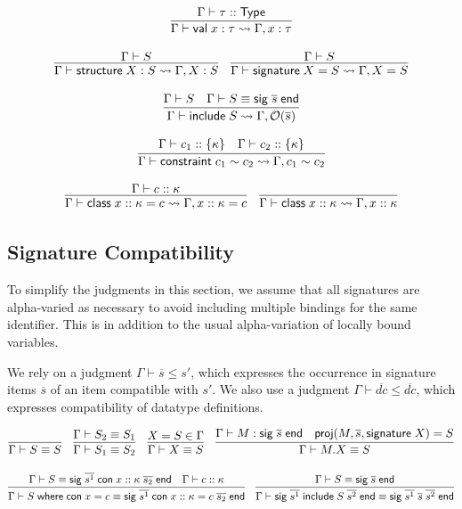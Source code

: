 \documentclass{article}
\newcommand{\mt}[1]{\mathsf{#1}}
\begin{document}
$$\infer{\Gamma \vdash \mt{val} \; x : \tau \leadsto \Gamma, x : \tau}{
  \Gamma \vdash \tau :: \mt{Type}
}$$

$$\infer{\Gamma \vdash \mt{structure} \; X : S \leadsto \Gamma, X : S}{
  \Gamma \vdash S
}
\quad \infer{\Gamma \vdash \mt{signature} \; X = S \leadsto \Gamma, X = S}{
  \Gamma \vdash S
}$$

$$\infer{\Gamma \vdash \mt{include} \; S \leadsto \Gamma, \mathcal O(\overline{s})}{
  \Gamma \vdash S
  & \Gamma \vdash S \equiv \mt{sig} \; \overline{s} \; \mt{end}
}$$

$$\infer{\Gamma \vdash \mt{constraint} \; c_1 \sim c_2 \leadsto \Gamma, c_1 \sim c_2}{
  \Gamma \vdash c_1 :: \{\kappa\}
  & \Gamma \vdash c_2 :: \{\kappa\}
}$$

$$\infer{\Gamma \vdash \mt{class} \; x :: \kappa = c \leadsto \Gamma, x :: \kappa = c}{
  \Gamma \vdash c :: \kappa
}
\quad \infer{\Gamma \vdash \mt{class} \; x :: \kappa \leadsto \Gamma, x :: \kappa}{}$$

\subsection{Signature Compatibility}

To simplify the judgments in this section, we assume that all signatures are alpha-varied as necessary to avoid including multiple bindings for the same identifier.  This is in addition to the usual alpha-variation of locally bound variables.

We rely on a judgment $\Gamma \vdash \overline{s} \leq s'$, which expresses the occurrence in signature items $\overline{s}$ of an item compatible with $s'$.  We also use a judgment $\Gamma \vdash \overline{dc} \leq \overline{dc}$, which expresses compatibility of datatype definitions.

$$\infer{\Gamma \vdash S \equiv S}{}
\quad \infer{\Gamma \vdash S_1 \equiv S_2}{
  \Gamma \vdash S_2 \equiv S_1
}
\quad \infer{\Gamma \vdash X \equiv S}{
  X = S \in \Gamma
}
\quad \infer{\Gamma \vdash M.X \equiv S}{
  \Gamma \vdash M : \mt{sig} \; \overline{s} \; \mt{end}
  & \mt{proj}(M, \overline{s}, \mt{signature} \; X) = S
}$$

$$\infer{\Gamma \vdash S \; \mt{where} \; \mt{con} \; x = c \equiv \mt{sig} \; \overline{s^1} \; \mt{con} \; x :: \kappa = c \; \overline{s_2} \; \mt{end}}{
  \Gamma \vdash S \equiv \mt{sig} \; \overline{s^1} \; \mt{con} \; x :: \kappa \; \overline{s_2} \; \mt{end}
  & \Gamma \vdash c :: \kappa
}
\quad \infer{\Gamma \vdash \mt{sig} \; \overline{s^1} \; \mt{include} \; S \; \overline{s^2} \; \mt{end} \equiv \mt{sig} \; \overline{s^1} \; \overline{s} \; \overline{s^2} \; \mt{end}}{
  \Gamma \vdash S \equiv \mt{sig} \; \overline{s} \; \mt{end}
}$$
\end{document}
